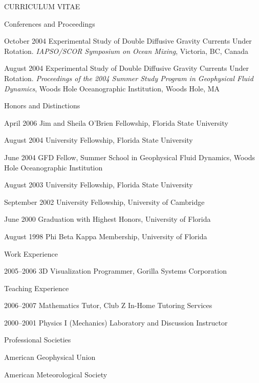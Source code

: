 \documentclass[11pt]{article}
\begin{document}
\begin{cv}{CURRICULUM VITAE}
\begin{cvlist}{Conferences and Proceedings}
  \item[October 2004] Experimental Study of Double Diffusive Gravity Currents Under Rotation. \emph{IAPSO/SCOR Symposium on Ocean Mixing}, Victoria, BC, Canada

  \item[August 2004] Experimental Study of Double Diffusive Gravity Currents Under Rotation. \emph{Proceedings of the 2004 Summer Study Program in Geophysical Fluid Dynamics}, Woods Hole Oceanographic Institution, Woods Hole, MA
\end{cvlist}

\begin{cvlist}{Honors and Distinctions}
  \item[April 2006] Jim and Sheila O'Brien Fellowship, Florida State University

  \item[August 2004] University Fellowship, Florida State University

  \item[June 2004] GFD Fellow, Summer School in Geophysical Fluid Dynamics, Woods Hole Oceanographic Institution

  \item[August 2003] University Fellowship, Florida State University

  \item[September 2002] University Fellowship, University of Cambridge

  \item[June 2000] Graduation with Highest Honors, University of Florida

  \item[August 1998] Phi Beta Kappa Membership, University of Florida
\end{cvlist}

\begin{cvlist}{Work Experience}
  \item[2005--2006] 3D Visualization Programmer, Gorilla Systems
  Corporation
\end{cvlist}

\begin{cvlist}{Teaching Experience}
  \item[2006--2007] Mathematics Tutor, Club Z In-Home Tutoring
  Services

  \item[2000--2001] Physics I (Mechanics) Laboratory and Discussion Instructor
\end{cvlist}

\begin{cvlist}{Professional Societies}
  \item American Geophysical Union
  \item American Meteorological Society
\end{cvlist}

\end{cv}
\end{document}
